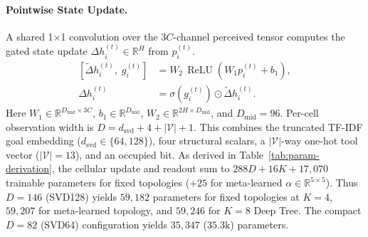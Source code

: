 \documentclass[10pt,twocolumn,letterpaper]{article}
\begin{document}
\paragraph{Pointwise State Update.}
A shared 1$\times$1 convolution over the $3C$-channel perceived tensor computes the gated state update $\Delta h_i^{(t)} \in \mathbb{R}^{H}$ from $p_i^{(t)}$.
\begin{equation}
  \begin{aligned}
    [\tilde{\Delta} h_i^{(t)}, \; g_i^{(t)}] &= W_2 \, \operatorname{ReLU}(W_1 p_i^{(t)} + b_1), \\
    \Delta h_i^{(t)} &= \sigma(g_i^{(t)}) \odot \tilde{\Delta} h_i^{(t)}.
  \end{aligned}
\end{equation}
Here $W_1 \in \mathbb{R}^{D_{\mathrm{mid}} \times 3C}$, $b_1 \in \mathbb{R}^{D_{\mathrm{mid}}}$, $W_2 \in \mathbb{R}^{2H \times D_{\mathrm{mid}}}$, and $D_{\mathrm{mid}} = 96$. Per-cell observation width is $D = d_{\text{svd}} + 4 + |\mathcal{V}| + 1$. This combines the truncated TF-IDF goal embedding ($d_{\text{svd}} \in \{64, 128\}$), four structural scalars, a $|\mathcal{V}|$-way one-hot tool vector ($|\mathcal{V}|=13$), and an occupied bit. As derived in Table~\ref{tab:param-derivation}, the cellular update and readout sum to $288D + 16K + 17{,}070$ trainable parameters for fixed topologies ($+25$ for meta-learned $\alpha \in \mathbb{R}^{5 \times 5}$). Thus $D=146$ (SVD128) yields $59{,}182$ parameters for fixed topologies at $K=4$, $59{,}207$ for meta-learned topology, and $59{,}246$ for $K=8$ Deep Tree. The compact $D=82$ (SVD64) configuration yields $35{,}347$ ($35.3\text{k}$) parameters.
\end{document}

